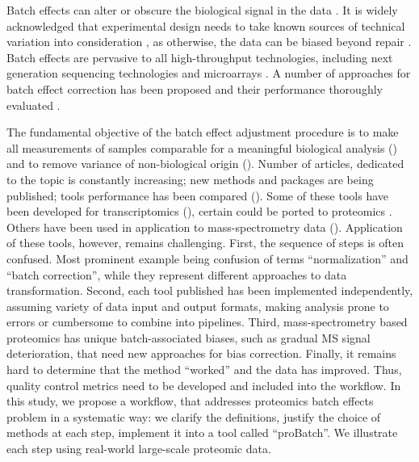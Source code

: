 \documentclass[alpha-refs]{wiley-article}
\begin{document}
Batch effects can alter or obscure the biological signal in the data \cite{Leek:2010aa, Parker:2012aa}. It is widely acknowledged that experimental design needs to take known sources of technical variation into consideration \cite{Oberg2009}, as otherwise, the data can be biased beyond repair  \cite{Hu2005, Gilad2015}. Batch effects are pervasive to all high-throughput technologies, including next generation sequencing technologies and microarrays \cite{Dillies:2013aa, Luo2010}. A number of approaches for batch effect correction has been proposed \cite{Johnson:2007aa, Sims:2008aa, Leek:2007aa, Benito2004} and their performance thoroughly evaluated . 

The fundamental objective of the batch effect adjustment procedure is to make all measurements of samples comparable for a meaningful biological analysis (\cite{Leek:2010aa}) and to remove variance of non-biological origin (\cite{Bolstad2003}). Number of articles, dedicated to the topic is constantly increasing; new methods and packages are being published; tools performance has been compared (\cite{Luo2010, Chen:2011ac, Dillies:2013aa, Chawade:2014aa}). Some of these tools have been developed for transcriptomics (\cite{Johnson:2007aa, Sims:2008aa, Leek:2007aa, Benito2004, Dillies:2013aa}), certain could be ported to proteomics \cite{Lee:2019}. Others have been used in application to mass-spectrometry data (\cite{Karpievitch2012, Chawade:2014aa, Valikangas2018, Gregori2012}). Application of these tools, however, remains challenging. First, the sequence of steps is often confused. Most prominent example being confusion of terms “normalization” and “batch correction”, while they represent different approaches to data transformation. Second, each tool published has been implemented independently, assuming variety of data input  and output formats, making analysis prone to errors or cumbersome to combine into pipelines. Third, mass-spectrometry based proteomics has unique batch-associated biases, such as gradual MS signal deterioration, that need new approaches for bias correction. Finally, it remains hard to determine that the method “worked” and the data has improved. Thus, quality control metrics need to be developed and included into the workflow. In this study, we propose a workflow, that addresses proteomics batch effects problem in a systematic way: we clarify the definitions, justify the choice of methods at each step, implement it into a tool called “proBatch”. We illustrate each step using real-world large-scale proteomic data.
\end{document}
